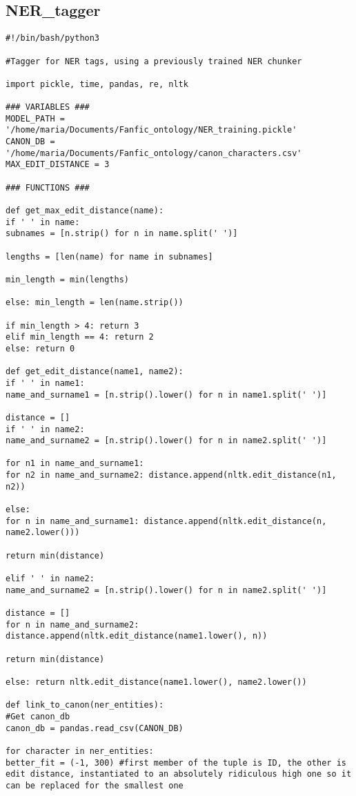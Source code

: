 \documentclass{pre-tfg}
\begin{document}
\subsection{NER\_tagger}
\begin{lstlisting}[style=consola]
#!/bin/bash/python3

#Tagger for NER tags, using a previously trained NER chunker

import pickle, time, pandas, re, nltk

### VARIABLES ###
MODEL_PATH = '/home/maria/Documents/Fanfic_ontology/NER_training.pickle'
CANON_DB = '/home/maria/Documents/Fanfic_ontology/canon_characters.csv'
MAX_EDIT_DISTANCE = 3

### FUNCTIONS ###

def get_max_edit_distance(name):
if ' ' in name:
subnames = [n.strip() for n in name.split(' ')]

lengths = [len(name) for name in subnames]

min_length = min(lengths)

else: min_length = len(name.strip())

if min_length > 4: return 3
elif min_length == 4: return 2
else: return 0

def get_edit_distance(name1, name2):
if ' ' in name1:
name_and_surname1 = [n.strip().lower() for n in name1.split(' ')]

distance = []
if ' ' in name2:
name_and_surname2 = [n.strip().lower() for n in name2.split(' ')]

for n1 in name_and_surname1:
for n2 in name_and_surname2: distance.append(nltk.edit_distance(n1, n2))

else:
for n in name_and_surname1: distance.append(nltk.edit_distance(n, name2.lower()))

return min(distance)

elif ' ' in name2:
name_and_surname2 = [n.strip().lower() for n in name2.split(' ')]

distance = []
for n in name_and_surname2: distance.append(nltk.edit_distance(name1.lower(), n))

return min(distance)

else: return nltk.edit_distance(name1.lower(), name2.lower())

def link_to_canon(ner_entities):
#Get canon_db
canon_db = pandas.read_csv(CANON_DB)

for character in ner_entities:
better_fit = (-1, 300) #first member of the tuple is ID, the other is edit distance, instantiated to an absolutely ridiculous high one so it can be replaced for the smallest one


\end{lstlisting}
\end{document}
